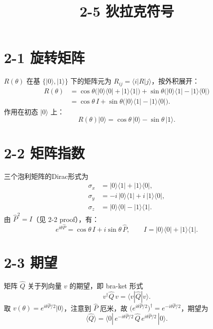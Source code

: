 \documentclass[11pt, a4paper]{ctexart}
\title{2-5 狄拉克符号}
\author{}
\date{}
\newcommand{\ket}[1]{|#1\rangle}
\newcommand{\bra}[1]{\langle#1|}
\newcommand{\mel}[3]{\langle#1|#2|#3\rangle}
\begin{document}
\maketitle

\section{2-1 旋转矩阵}

$R(\theta)$ 在基 $\{\ket{0},\ket{1}\}$ 下的矩阵元为
$R_{ij}=\bra{i}R\ket{j}$，按外积展开：
\begin{align*}
R(\theta)
&=\cos\theta\bigl(\ket{0}\bra{0}+\ket{1}\bra{1}\bigr)
  +\sin\theta\bigl(\ket{0}\bra{1}-\ket{1}\bra{0}\bigr) \\
&=\cos\theta\,I+\sin\theta\bigl(\ket{0}\bra{1}-\ket{1}\bra{0}\bigr).
\end{align*}
作用在初态 $\ket{0}$ 上：
\begin{equation}
R(\theta)\ket{0}=\cos\theta\,\ket{0}-\sin\theta\,\ket{1}.
\end{equation}

\section{2-2 矩阵指数}

三个泡利矩阵的Dirac形式为
\begin{align}
\sigma_x &= \ket{0}\bra{1}+\ket{1}\bra{0},\\
\sigma_y &= -i\,\ket{0}\bra{1}+i\,\ket{1}\bra{0},\\
\sigma_z &= \ket{0}\bra{0}-\ket{1}\bra{1}.
\end{align}
由 $\hat P^2=I$（见 2-2 proof），有：
\begin{equation}
e^{i\theta\hat P}=\cos\theta\,I+i\sin\theta\,\hat P,
\qquad
I=\ket{0}\bra{0}+\ket{1}\bra{1}.
\end{equation}

\section{2-3 期望}

矩阵 $\hat Q$ 关于列向量 $v$ 的期望，即 bra-ket 形式
\begin{equation}
v^\dagger \hat Q\,v=\mel{v}{\hat Q}{v}.
\end{equation}
取 $v(\theta)=e^{i\theta\hat P/2}\ket{0}$，注意到 $\hat P$ 厄米，故
$\bigl(e^{i\theta\hat P/2}\bigr)^\dagger=e^{-i\theta\hat P/2}$，期望为
\begin{equation}
\langle\hat Q\rangle
=\bra{0}\,e^{-i\theta\hat P/2}\,\hat Q\,e^{i\theta\hat P/2}\,\ket{0}.
\end{equation}
\end{document}
